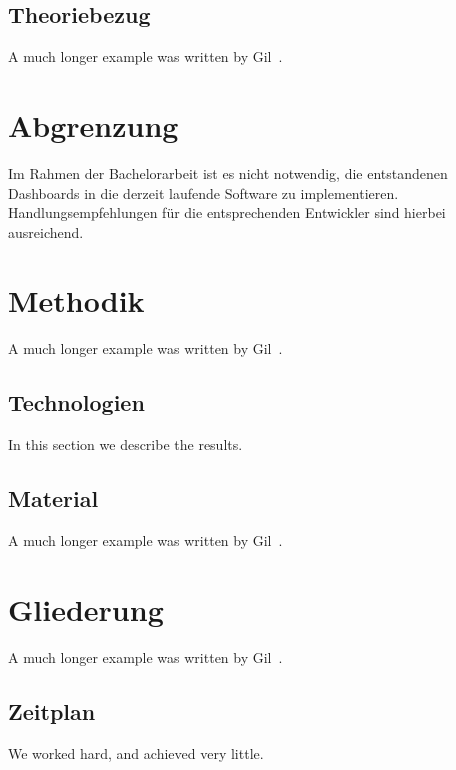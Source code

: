 \documentclass[12pt]{article}
\begin{document}
\subsection{Theoriebezug}\label{previous work}
A much longer \LaTeXe{} example was written by Gil~\cite{Gil:02}.


\section{Abgrenzung}\label{previous work}
Im Rahmen der Bachelorarbeit ist es nicht notwendig, die entstandenen Dashboards in die derzeit laufende Software zu implementieren. Handlungsempfehlungen für die entsprechenden Entwickler sind hierbei ausreichend. \\


\section{Methodik}\label{previous work}
A much longer \LaTeXe{} example was written by Gil~\cite{Gil:02}.

\subsection{Technologien}\label{results}
In this section we describe the results.

\subsection{Material}\label{previous work}
A much longer \LaTeXe{} example was written by Gil~\cite{Gil:02}.

\section{Gliederung}\label{previous work}
A much longer \LaTeXe{} example was written by Gil~\cite{Gil:02}.

\subsection{Zeitplan}\label{conclusions}
We worked hard, and achieved very little.


%
\end{document}

